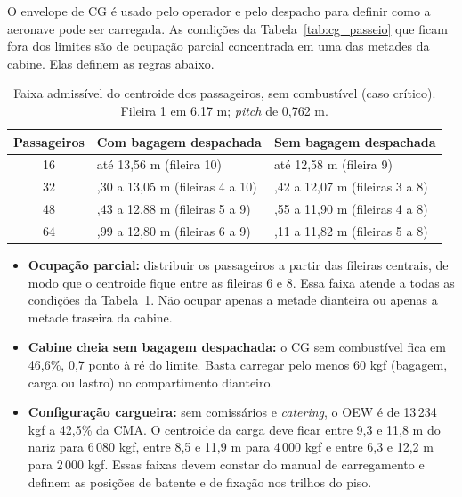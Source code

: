 O envelope de CG é usado pelo operador e pelo despacho para definir como a aeronave pode ser carregada. As condições da Tabela~\ref{tab:cg_passeio} que ficam fora dos limites são de ocupação parcial concentrada em uma das metades da cabine. Elas definem as regras abaixo.

\begin{table}[H]
  \centering
  \linespread{1}\small
  \setlength{\tabcolsep}{4pt}
  \caption{Faixa admissível do centroide dos passageiros, sem combustível (caso crítico). Fileira 1 em 6,17 m; \emph{pitch} de 0,762 m.}
  \label{tab:cg_operador}
  \begin{tabularx}{\textwidth}{c >{\raggedright\arraybackslash}X >{\raggedright\arraybackslash}X}
    \toprule
    \textbf{Passageiros} & \textbf{Com bagagem despachada} & \textbf{Sem bagagem despachada} \\
    \midrule
    16 & até 13,56 m (fileira 10) & até 12,58 m (fileira 9) \\
    32 & 8,30 a 13,05 m (fileiras 4 a 10) & 7,42 a 12,07 m (fileiras 3 a 8) \\
    48 & 9,43 a 12,88 m (fileiras 5 a 9) & 8,55 a 11,90 m (fileiras 4 a 8) \\
    64 & 9,99 a 12,80 m (fileiras 6 a 9) & 9,11 a 11,82 m (fileiras 5 a 8) \\
    \bottomrule
  \end{tabularx}
\end{table}

\begin{itemize}
    \item \textbf{Ocupação parcial:} distribuir os passageiros a partir das fileiras centrais, de modo que o centroide fique entre as fileiras 6 e 8. Essa faixa atende a todas as condições da Tabela~\ref{tab:cg_operador}. Não ocupar apenas a metade dianteira ou apenas a metade traseira da cabine.
    \item \textbf{Cabine cheia sem bagagem despachada:} o CG sem combustível fica em 46,6\%, 0,7 ponto à ré do limite. Basta carregar pelo menos 60 kgf (bagagem, carga ou lastro) no compartimento dianteiro.
    \item \textbf{Configuração cargueira:} sem comissários e \emph{catering}, o OEW é de 13\,234 kgf a 42,5\% da CMA. O centroide da carga deve ficar entre 9,3 e 11,8 m do nariz para 6\,080 kgf, entre 8,5 e 11,9 m para 4\,000 kgf e entre 6,3 e 12,2 m para 2\,000 kgf. Essas faixas devem constar do manual de carregamento e definem as posições de batente e de fixação nos trilhos do piso.
\end{itemize}

